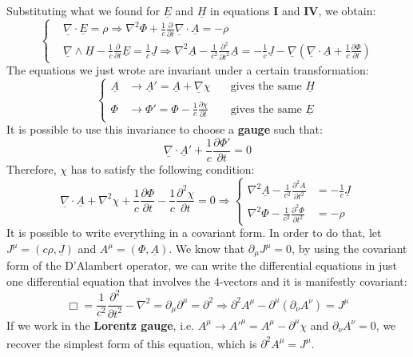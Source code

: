\documentclass[../main.tex]{subfiles}
\begin{document}
Substituting what we found for $\underline{E}$ and $\underline{H}$ in equations \textbf{\RN{1}} and \textbf{\RN{4}}, we obtain:
\[
\left\{
\begin{aligned}
&\underline{\nabla}\cdot\underline{E}=\rho\Rightarrow\nabla^2\Phi+\frac{1}{c}\frac{\partial}{\partial t}\underline{\nabla}\cdot\underline{A}=-\rho\\
&\underline{\nabla}\wedge\underline{H}-\frac{1}{c}\frac{\partial}{\partial t}\underline{E}=\frac{1}{c}\underline{J}\Rightarrow\nabla^2\underline{A}-\frac{1}{c^2}\frac{\partial^2}{\partial t^2}\underline{A}=-\frac{1}{c}\underline{J}-\underline{\nabla}\left(\underline{\nabla}\cdot\underline{A}+\frac{1}{c}\frac{\partial\Phi}{\partial t}\right)
\end{aligned}
\right.
\]
The equations we just wrote are invariant under a certain transformation:
\[
\left\{
\begin{aligned}
\underline{A}&\xrightarrow[]{}\underline{A}'=\underline{A}+\underline{\nabla}\chi \quad &\text{gives the same $\underline{H}$}\\
\Phi&\xrightarrow[]{}\Phi'=\Phi-\frac{1}{c}\frac{\partial\chi}{\partial t} \quad &\text{gives the same $\underline{E}$}
\end{aligned}
\right.
\]
It is possible to use this invariance to choose a \textbf{gauge} such that:
\[
\underline{\nabla}\cdot\underline{A}'+\frac{1}{c}\frac{\partial\Phi'}{\partial t}=0
\]
Therefore, $\chi$ has to satisfy the following condition:
\[
\underline{\nabla}\cdot\underline{A}+\nabla^2\chi+\frac{1}{c}\frac{\partial\Phi}{\partial t}-\frac{1}{c}\frac{\partial^2\chi}{\partial t}=0\Rightarrow\left\{
\begin{aligned}
\nabla^2\underline{A}-\frac{1}{c^2}\frac{\partial^2\underline{A}}{\partial t^2}&=-\frac{1}{c}\underline{J}\\
\nabla^2\Phi-\frac{1}{c^2}\frac{\partial^2\Phi}{\partial t^2}&=-\rho
\end{aligned}
\right.
\]
It is possible to write everything in a covariant form. In order to do that, let $J^\mu=(c\rho,\underline{J})$ and $A^\mu=(\Phi,\underline{A})$. We know that $\partial_\mu J^\mu=0$, by using the covariant form of the D'Alambert operator, we can write the differential equations in just one differential equation that involves the 4-vectors and it is manifestly covariant:
\[
\Box=\frac{1}{c^2}\frac{\partial^2}{\partial t^2}-\nabla^2=\partial_\mu\partial^\mu=\partial^2\Rightarrow\partial^2 A^\mu-\partial^\mu(\partial_\nu A^\nu)=J^\mu
\]
If we work in the \textbf{Lorentz gauge}, i.e. $A^\mu\xrightarrow[]{}A'^\mu=A^\mu-\partial^\mu\chi$ and $\partial_\nu A^\nu=0$, we recover the simplest form of this equation, which is $\partial^2 A^\mu=J^\mu$.
\end{document}

